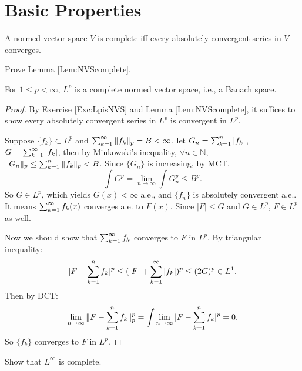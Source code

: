 \section{Basic Properties}
\begin{lem}
    \label{Lem:NVScomplete}
    A normed vector space $V$ is complete iff every absolutely 
    convergent series in $V$ converges. 
\end{lem}
\begin{exc}
    Prove Lemma \ref{Lem:NVScomplete}.
\end{exc}
\begin{thm}
    For $1\le p<\infty$, $L^{p}$ is a complete normed vector space, 
    i.e., a Banach space.
\end{thm}
\begin{proof}
    By Exercise \ref{Exc:LpisNVS} and 
    Lemma \ref{Lem:NVScomplete}, it suffices to show 
    every absolutely convergent series in $L^{p}$ 
    is convergent in $L^{p}$. 

    Suppose $\{f_{k}\}\subset L^{p}$ and 
    $\sum_{k=1}^{\infty}\|f_{k}\|_{p}=B<\infty$, let 
    $G_{n}=\sum_{k=1}^{n}|f_{k}|$, $G=\sum_{k=1}^{\infty}|f_{k}|$, then 
    by Minkowski's inequality, 
    $\forall n\in\mathbb{N}$, 
    $\|G_{n}\|_{p}\le\sum_{k=1}^{n}\|f_{k}\|_{p}<B$. 
    Since $\{G_{n}\}$ is increasing, by MCT, 
    \begin{displaymath}
        \int G^{p}=\lim_{n\rightarrow\infty}\int G_{n}^{p}
        \le B^{p}.
    \end{displaymath}
    So $G\in L^{p}$, which yields $G(x)<\infty$ a.e., and 
    $\{f_{n}\}$ is absolutely convergent a.e.. 
    It means $\sum_{k=1}^{\infty}f_{k}(x)$ converges a.e. to $F(x)$. 
    Since $|F|\le G$ and $G\in L^{p}$, $F\in L^{p}$ as well. 

    Now we should show that $\sum_{k=1}^{\infty}f_{k}$ 
    converges to $F$ in $L^{p}$. 
    By triangular inequality:
    \begin{displaymath}
        |F-\sum_{k=1}^{n}f_{k}|^{p}
        \le(|F|+\sum_{k=1}^{\infty}|f_{k}|)^{p}
        \le(2G)^{p}\in L^{1}.
    \end{displaymath}
    Then by DCT:
    \begin{displaymath}
        \lim_{n\rightarrow\infty}\|F-\sum_{k=1}^{n}f_{k}\|_{p}^{p}
        =\int\lim_{n\rightarrow\infty}|F-\sum_{k=1}^{n}f_{k}|^{p}
        =0.
    \end{displaymath}
    So $\{f_{k}\}$ converges to $F$ in $L^{p}$.
\end{proof}
\begin{exc}
    Show that $L^{\infty}$ is complete.
\end{exc}
